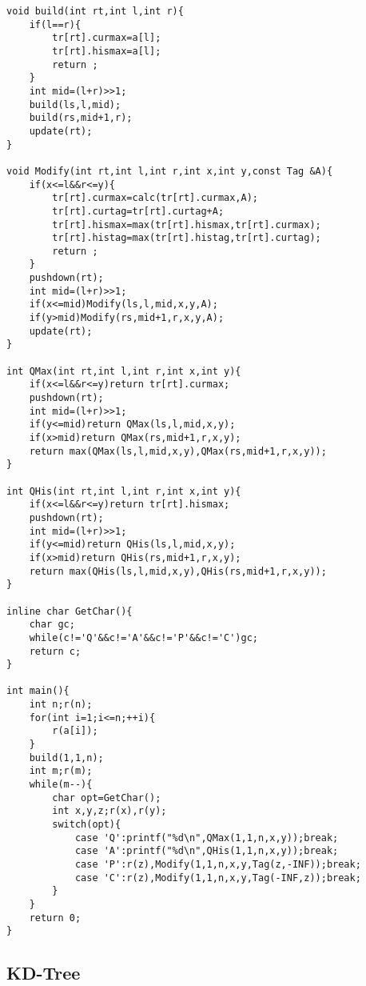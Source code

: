 \documentclass{ctexart}
\begin{document}
\begin{lstlisting}
void build(int rt,int l,int r){
	if(l==r){
		tr[rt].curmax=a[l];
		tr[rt].hismax=a[l];
		return ;
	}
	int mid=(l+r)>>1;
	build(ls,l,mid);
	build(rs,mid+1,r);
	update(rt);
}

void Modify(int rt,int l,int r,int x,int y,const Tag &A){
	if(x<=l&&r<=y){
		tr[rt].curmax=calc(tr[rt].curmax,A);
		tr[rt].curtag=tr[rt].curtag+A;
		tr[rt].hismax=max(tr[rt].hismax,tr[rt].curmax);
		tr[rt].histag=max(tr[rt].histag,tr[rt].curtag);
		return ;
	}
	pushdown(rt);
	int mid=(l+r)>>1;
	if(x<=mid)Modify(ls,l,mid,x,y,A);
	if(y>mid)Modify(rs,mid+1,r,x,y,A);
	update(rt);
}
		
int QMax(int rt,int l,int r,int x,int y){
	if(x<=l&&r<=y)return tr[rt].curmax;
	pushdown(rt);
	int mid=(l+r)>>1;
	if(y<=mid)return QMax(ls,l,mid,x,y);
	if(x>mid)return QMax(rs,mid+1,r,x,y);
	return max(QMax(ls,l,mid,x,y),QMax(rs,mid+1,r,x,y));
}
		
int QHis(int rt,int l,int r,int x,int y){
	if(x<=l&&r<=y)return tr[rt].hismax;
	pushdown(rt);
	int mid=(l+r)>>1;
	if(y<=mid)return QHis(ls,l,mid,x,y);
	if(x>mid)return QHis(rs,mid+1,r,x,y);
	return max(QHis(ls,l,mid,x,y),QHis(rs,mid+1,r,x,y));
}

inline char GetChar(){
	char gc;
	while(c!='Q'&&c!='A'&&c!='P'&&c!='C')gc;
	return c;
}

int main(){
	int n;r(n);
	for(int i=1;i<=n;++i){
		r(a[i]);
	}
	build(1,1,n);
	int m;r(m);
	while(m--){
		char opt=GetChar();
		int x,y,z;r(x),r(y);
		switch(opt){
			case 'Q':printf("%d\n",QMax(1,1,n,x,y));break;
			case 'A':printf("%d\n",QHis(1,1,n,x,y));break;
			case 'P':r(z),Modify(1,1,n,x,y,Tag(z,-INF));break;
			case 'C':r(z),Modify(1,1,n,x,y,Tag(-INF,z));break;
		}
	}
	return 0;
}
\end{lstlisting}
\subsection{KD-Tree}
\end{document}
